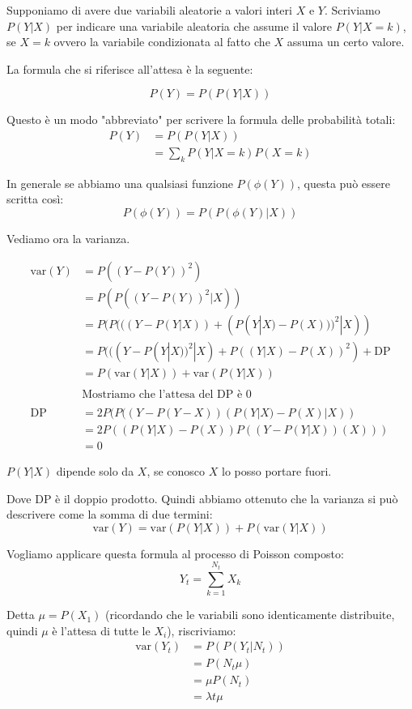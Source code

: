 \documentclass[a4paper,12pt]{book}
\begin{document}
Supponiamo di avere due variabili aleatorie a valori interi $ X $ e $ Y $. Scriviamo $ P(Y | X) $ per indicare una variabile aleatoria che assume il valore $ P(Y | X = k) $, se $ X = k $ ovvero la variabile condizionata al fatto che $ X $ assuma un certo valore.

La formula che si riferisce all'attesa è la seguente:

$$ P(Y) = P(P(Y | X)) $$

Questo è un modo "abbreviato" per scrivere la formula delle probabilità totali:
\begin{align*}
	P(Y) & = P(P(Y | X)) \\
	& = \sum_k P(Y | X = k) P(X = k)
\end{align*}

In generale se abbiamo una qualsiasi funzione $ P(\phi(Y)) $, questa può essere scritta così:
$$ P(\phi(Y)) = P(P(\phi(Y) | X)) $$

Vediamo ora la varianza.

\begin{align*}
	\text{var}(Y) & = P((Y-P(Y))^2) \\
	 & = P(P((Y-P(Y))^2 | X ))\\
	 & = P(P(((Y-P(Y|X)) + (P(Y|X) - P(X)))^2  | X))  \\
	 & = P( ((Y-P(Y|X))^2|X)   + P((Y | X) - P(X)  )^2 ) + \text{DP} \\
	  & = P(\text{var}(Y|X)) + \text{var}(P(Y|X)) \\ 
	 \\
	 & \text{Mostriamo che l'attesa del DP è 0} \\
	 \\
	 \text{DP} & = 2P(P((Y - P(Y-X)) (P(Y|X) - P(X)|X )) \\
	 & = 2P((P(Y|X) -P(X)) P((Y-P(Y|X)) (X)  ) ) \\ 
	 & = 0
\end{align*}

$ P(Y|X) $ dipende solo da $ X $, se conosco $ X $ lo posso portare fuori.

Dove DP è il doppio prodotto. Quindi abbiamo ottenuto che la varianza si può descrivere come la somma di due termini:
$$ \text{var}(Y) = \text{var}(P(Y|X)) + P(\text{var}(Y|X)) $$

Vogliamo applicare questa formula al processo di Poisson composto:
$$ Y_t = \sum_{k = 1}^{N_t} X_k $$ 

Detta $\mu = P(X_1)$ (ricordando che le variabili sono identicamente distribuite, quindi $ \mu $ è l'attesa di tutte le $ X_i $), riscriviamo:
\begin{align*}
	\text{var}(Y_t) & = P(P(Y_t | N_t)) \\
	& = P(N_t \mu) \\
	& = \mu P(N_t) \\
	& = \lambda t \mu
\end{align*}
\end{document}
